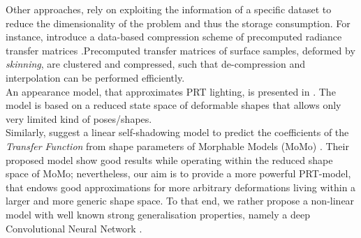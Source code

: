 Other approaches, rely on exploiting the information of a specific dataset to reduce the dimensionality of the problem and thus the storage consumption. For instance, \cite{SkinningPRT} introduce a data-based compression scheme of precomputed radiance transfer matrices .Precomputed transfer matrices of surface samples, deformed by \textit{skinning}, are clustered and compressed, such that de-compression and interpolation can be performed efficiently.
\\  
An appearance model, that approximates PRT lighting, is presented in  \cite{James_Fatahalian}. The model is based on a reduced state space of deformable shapes that allows only very limited kind of poses/shapes. 
\\
Similarly, \cite{MoMoPRT} suggest a linear self-shadowing model to predict the coefficients of the \textit{Transfer Function} from shape parameters of Morphable Models (MoMo) \cite{MoMo}. Their proposed model show good results while operating within the reduced shape space of MoMo; nevertheless, our aim is to provide a more powerful PRT-model, that endows good approximations for more arbitrary deformations living within a larger and more generic shape space. To that end, we rather propose a non-linear model with well known strong generalisation properties, namely a deep Convolutional Neural Network \cite{DL_nature, ImageNet_CNN, CNN_videoClassification}.  
